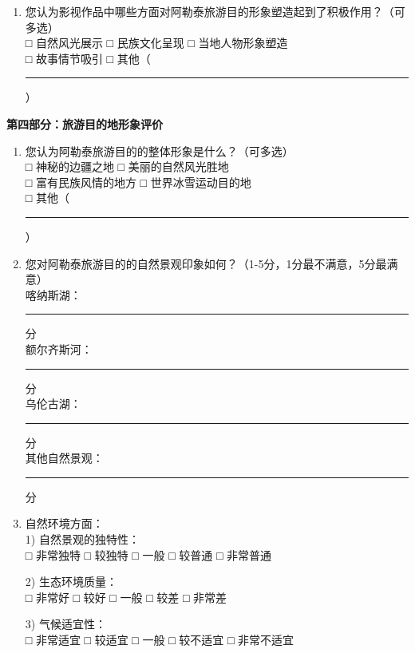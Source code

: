 \documentclass[10pt]{article}
\newcommand{\fillline}{\rule{2.5cm}{0.4pt}}
\begin{document}
\begin{CJK*}{UTF8}{gbsn}
\begin{enumerate}[label=\arabic*., resume, itemsep=0.8cm]
\item 您认为影视作品中哪些方面对阿勒泰旅游目的形象塑造起到了积极作用？（可多选）\\
□ 自然风光展示 \hspace{2cm} □ 民族文化呈现 \hspace{2cm} □ 当地人物形象塑造\\
□ 故事情节吸引 \hspace{2cm} □ 其他（\fillline）
\end{enumerate}

\vspace{0.5cm}
\textbf{第四部分：旅游目的地形象评价}

\begin{enumerate}[label=\arabic*., resume, itemsep=0.8cm]
\item 您认为阿勒泰旅游目的的整体形象是什么？（可多选）\\
□ 神秘的边疆之地 \hspace{2cm} □ 美丽的自然风光胜地\\
□ 富有民族风情的地方 \hspace{2cm} □ 世界冰雪运动目的地\\
□ 其他（\fillline）

\item 您对阿勒泰旅游目的的自然景观印象如何？（1-5分，1分最不满意，5分最满意）\\
喀纳斯湖：\fillline 分\\
额尔齐斯河：\fillline 分\\
乌伦古湖：\fillline 分\\
其他自然景观：\fillline 分

\item 自然环境方面：\\
1) 自然景观的独特性：\\
□ 非常独特 \hspace{1cm} □ 较独特 \hspace{1cm} □ 一般 \hspace{1cm} □ 较普通 \hspace{1cm} □ 非常普通

2) 生态环境质量：\\
□ 非常好 \hspace{1cm} □ 较好 \hspace{1cm} □ 一般 \hspace{1cm} □ 较差 \hspace{1cm} □ 非常差

3) 气候适宜性：\\
□ 非常适宜 \hspace{1cm} □ 较适宜 \hspace{1cm} □ 一般 \hspace{1cm} □ 较不适宜 \hspace{1cm} □ 非常不适宜


\end{enumerate}
\end{CJK*}
\end{document}
